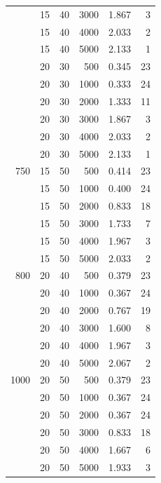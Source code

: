 \begin{longtable}{rrrrrr}
 & 15 & 40 & 3000 & 1.867 & 3 \\
 & 15 & 40 & 4000 & 2.033 & 2 \\
 & 15 & 40 & 5000 & 2.133 & 1 \\
 & 20 & 30 & 500 & 0.345 & 23 \\
 & 20 & 30 & 1000 & 0.333 & 24 \\
 & 20 & 30 & 2000 & 1.333 & 11 \\
 & 20 & 30 & 3000 & 1.867 & 3 \\
 & 20 & 30 & 4000 & 2.033 & 2 \\
 & 20 & 30 & 5000 & 2.133 & 1 \\
\midrule
750 & 15 & 50 & 500 & 0.414 & 23 \\
 & 15 & 50 & 1000 & 0.400 & 24 \\
 & 15 & 50 & 2000 & 0.833 & 18 \\
 & 15 & 50 & 3000 & 1.733 & 7 \\
 & 15 & 50 & 4000 & 1.967 & 3 \\
 & 15 & 50 & 5000 & 2.033 & 2 \\
\midrule
800 & 20 & 40 & 500 & 0.379 & 23 \\
 & 20 & 40 & 1000 & 0.367 & 24 \\
 & 20 & 40 & 2000 & 0.767 & 19 \\
 & 20 & 40 & 3000 & 1.600 & 8 \\
 & 20 & 40 & 4000 & 1.967 & 3 \\
 & 20 & 40 & 5000 & 2.067 & 2 \\
\midrule
1000 & 20 & 50 & 500 & 0.379 & 23 \\
 & 20 & 50 & 1000 & 0.367 & 24 \\
 & 20 & 50 & 2000 & 0.367 & 24 \\
 & 20 & 50 & 3000 & 0.833 & 18 \\
 & 20 & 50 & 4000 & 1.667 & 6 \\
 & 20 & 50 & 5000 & 1.933 & 3 \\
\end{longtable}
